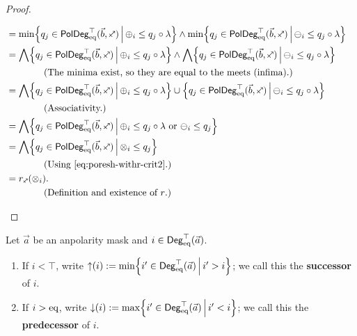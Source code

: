 \documentclass[a4paper]{memoir}
\begin{document}
\begin{proof}
\begin{enumerate}
\begin{itemize}
\begin{align*}
				&= \min \set{q_j \in \poldegeqtop(\vec b, \ypolar)}{\pospol_i \leq q_j \circ \lambda} \wedge \min \set{q_j \in \poldegeqtop(\vec b, \ypolar)}{\negpol_i \leq q_j \circ \lambda} \\
				&= \bigwedge \set{q_j \in \poldegeqtop(\vec b, \ypolar)}{\pospol_i \leq q_j \circ \lambda} \wedge \bigwedge \set{q_j \in \poldegeqtop(\vec b, \ypolar)}{\negpol_i \leq q_j \circ \lambda} \\
				&\qquad \qquad \text{(The minima exist, so they are equal to the meets (infima).)} \\
				&= \bigwedge \set{q_j \in \poldegeqtop(\vec b, \ypolar)}{\pospol_i \leq q_j \circ \lambda} \cup \set{q_j \in \poldegeqtop(\vec b, \ypolar)}{\negpol_i \leq q_j \circ \lambda} \\
				&\qquad \qquad \text{(Associativity.)} \\
				&= \bigwedge \set{q_j \in \poldegeqtop(\vec b, \ypolar)}{\pospol_i \leq q_j \circ \lambda \text{ or } \negpol_i \leq q_j} \\
				&= \bigwedge \set{q_j \in \poldegeqtop(\vec b, \ypolar)}{\mixpol_i \leq q_j} \\
				&\qquad \qquad \text{(Using \cref{eq:poresh-withr-crit2}.)} \\
				&= r_\ypolar(\mixpol_i). \\
				&\qquad \qquad \text{(Definition and existence of $r$.)} &\qedhere
			\end{align*}
		\end{itemize}
	\end{enumerate}
\end{proof}

\begin{definition} \label{def:suc-degree}
	Let $\vec a$ be an anpolarity mask and $i \in {\mathsf{Deg}_{\mathrm{eq}}^\top}(\vec a)$.
	\begin{enumerate}
		\item If $i < \top$, write ${\uparrow}(i) := \min \mathopen{}\left\{ i' \in {\mathsf{Deg}_{\mathrm{eq}}^\top}(\vec a) \,\middle|\, i' > i \right\}\mathclose{}$; we call this the \textbf{successor} of $i$.
		\item If $i > {\mathrm{eq}}$, write ${\downarrow}(i) := \max \mathopen{}\left\{ i' \in {\mathsf{Deg}_{\mathrm{eq}}^\top}(\vec a) \,\middle|\, i' < i \right\}\mathclose{}$; we call this the \textbf{predecessor} of $i$.
	\end{enumerate}
\end{definition}
\end{document}
